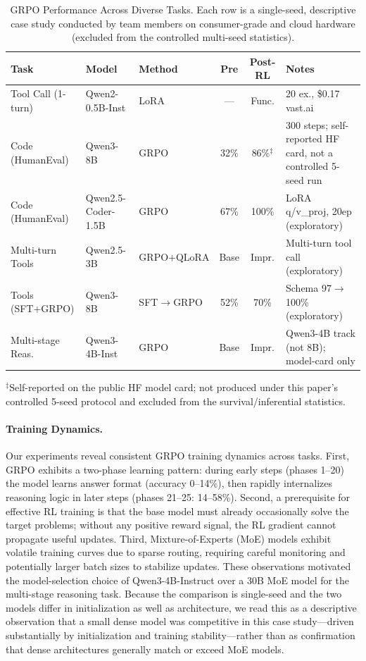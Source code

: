 \documentclass[manuscript,review,anonymous]{acmart}
\begin{document}
\begin{table}[t]
\centering
\caption{GRPO Performance Across Diverse Tasks. Each row is a single-seed,
descriptive case study conducted by team members on consumer-grade and cloud
hardware (excluded from the controlled multi-seed statistics).}
\label{tab:task_grpo}
\footnotesize
\begin{tabular}{@{}l l l c c p{2.8cm}@{}}
\toprule
\textbf{Task} & \textbf{Model} & \textbf{Method} & \textbf{Pre} & \textbf{Post-RL} & \textbf{Notes} \\
\midrule
Tool Call (1-turn) & Qwen2-0.5B-Inst & LoRA & --- & Func. & 20 ex., \$0.17 vast.ai \\
Code (HumanEval) & Qwen3-8B & GRPO & 32\% & 86\%$^{\ddagger}$ & 300 steps; self-reported HF card, not a controlled 5-seed run \\
Code (HumanEval) & Qwen2.5-Coder-1.5B & GRPO & 67\% & 100\% & LoRA q/v\_proj, 20ep (exploratory) \\
Multi-turn Tools & Qwen2.5-3B & GRPO+QLoRA & Base & Impr. & Multi-turn tool call (exploratory) \\
Tools (SFT+GRPO) & Qwen3-8B & SFT$\to$GRPO & 52\% & 70\% & Schema 97$\to$100\% (exploratory) \\
Multi-stage Reas. & Qwen3-4B-Inst & GRPO & Base & Impr. & Qwen3-4B track (not 8B); model-card only \\
\bottomrule
\end{tabular}

\vspace{2pt}
{\scriptsize $^{\ddagger}$Self-reported on the public HF model card; not produced under this paper's controlled 5-seed protocol and excluded from the survival/inferential statistics.}

\end{table}

\paragraph{Training Dynamics.}
Our experiments reveal consistent GRPO training dynamics across tasks.
First, GRPO exhibits a two-phase learning pattern: during early steps (phases
1--20) the model learns answer format (accuracy 0--14\%), then rapidly
internalizes reasoning logic in later steps (phases 21--25: 14--58\%).
Second, a prerequisite for effective RL training is that the base model must
already occasionally solve the target problems; without any positive reward
signal, the RL gradient cannot propagate useful updates. Third, Mixture-of-Experts
(MoE) models exhibit volatile training curves due to sparse routing, requiring
careful monitoring and potentially larger batch sizes to stabilize updates.
These observations motivated the model-selection choice of Qwen3-4B-Instruct
over a 30B MoE model for the multi-stage reasoning task. Because the comparison
is single-seed and the two models differ in initialization as well as
architecture, we read this as a descriptive observation that a small dense
model was competitive in this case study---driven substantially by
initialization and training stability---rather than as confirmation that dense
architectures generally match or exceed MoE models.
\end{document}
